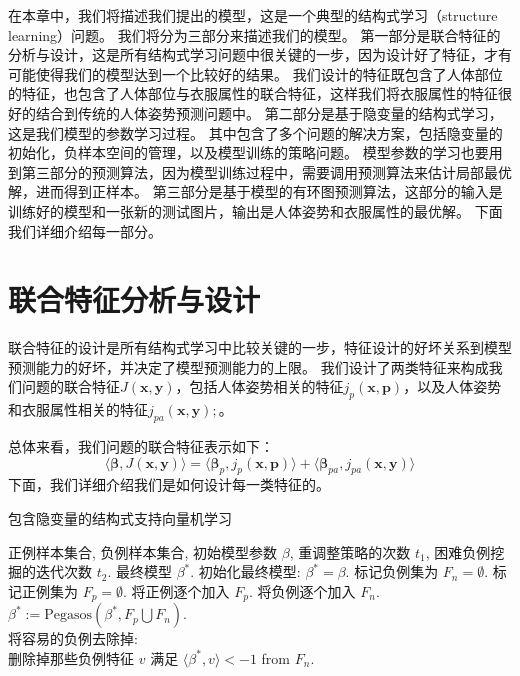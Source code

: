 在本章中，我们将描述我们提出的模型，这是一个典型的结构式学习（structure learning）问题。
我们将分为三部分来描述我们的模型。
第一部分是联合特征的分析与设计，这是所有结构式学习问题中很关键的一步，因为设计好了特征，才有可能使得我们的模型达到一个比较好的结果。
我们设计的特征既包含了人体部位的特征，也包含了人体部位与衣服属性的联合特征，这样我们将衣服属性的特征很好的结合到传统的人体姿势预测问题中。
第二部分是基于隐变量的结构式学习，这是我们模型的参数学习过程。
其中包含了多个问题的解决方案，包括隐变量的初始化，负样本空间的管理，以及模型训练的策略问题。
模型参数的学习也要用到第三部分的预测算法，因为模型训练过程中，需要调用预测算法来估计局部最优解，进而得到正样本。
第三部分是基于模型的有环图预测算法，这部分的输入是训练好的模型和一张新的测试图片，输出是人体姿势和衣服属性的最优解。
下面我们详细介绍每一部分。

\section{联合特征分析与设计}
联合特征的设计是所有结构式学习中比较关键的一步\cite{svm-struct}，特征设计的好坏关系到模型预测能力的好坏，并决定了模型预测能力的上限。
我们设计了两类特征来构成我们问题的联合特征$J(\mathbf{x}, \mathbf{y})$，包括人体姿势相关的特征$j_p(\mathbf{x}, \mathbf{p})$，以及人体姿势和衣服属性相关的特征$j_{pa}(\mathbf{x}, \mathbf{y});$。

总体来看，我们问题的联合特征表示如下：
\begin{equation}
    \label{eq:feature}
    \langle \mathbf{\beta}, J(\mathbf{x},\mathbf{y}) \rangle = \langle \mathbf{\beta}_p, j_p(\mathbf{x}, \mathbf{p}) \rangle + \langle \mathbf{\beta}_{pa}, j_{pa}(\mathbf{x},\mathbf{y}) \rangle
\end{equation}
下面，我们详细介绍我们是如何设计每一类特征的。




\begin{algorithm}
\caption{包含隐变量的结构式支持向量机学习}
\begin{algorithmic}[1]
    \REQUIRE 正例样本集合, 负例样本集合, 初始模型参数 $\beta$, 重调整策略的次数 $t_1$, 困难负例挖掘的迭代次数 $t_2$.
    \ENSURE 最终模型 ${\beta}^*$.
    \STATE 初始化最终模型: ${\beta}^* = \beta$.
    \STATE 标记负例集为 $F_n = \emptyset$.
        \STATE 标记正例集为 $F_p = \emptyset$.
        \STATE 将正例逐个加入 $F_p$.
            \STATE 将负例逐个加入 $F_n$.
            \STATE ${\beta}^* := \mathrm{Pegasos}({\beta}^*, F_p \bigcup F_n)$.\\
            \STATE 将容易的负例去除掉: \\
             删除掉那些负例特征 $v$ 满足 $\langle{\beta}^*, v \rangle < -1$ from $F_n$.
        \ENDFOR
    \ENDFOR
\end{algorithmic}
\label{alg:train}
\end{algorithm}


